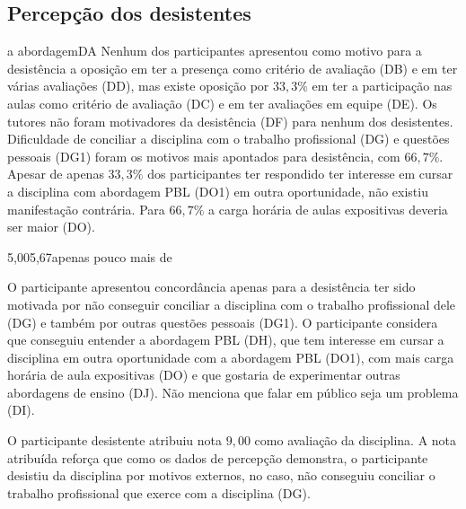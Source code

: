 \subsection{Percepção dos desistentes}
%
{a abordagem}{DA}{}{}
Nenhum dos participantes apresentou como motivo para a desistência a
oposição em ter a presença como critério de avaliação (DB) e
em ter várias avaliações (DD), mas existe oposição por $33,3\%$
em ter a participação nas aulas como critério de avaliação (DC) e em ter
avaliações em equipe (DE).
Os tutores não foram motivadores da desistência (DF) para nenhum
dos desistentes.
Dificuldade de conciliar a disciplina com
o trabalho profissional (DG) e questões pessoais (DG1)
foram os motivos mais apontados para desistência,
com $66,7\%$.
Apesar de apenas $33,3\%$ dos participantes ter respondido ter interesse
em cursar a disciplina com abordagem \ac{PBL} (DO1) em outra oportunidade,
não existiu manifestação contrária.
Para $66,7\%$ a carga horária de aulas expositivas deveria ser maior (DO).

{5,00}{5,67}{apenas pouco mais de}

O participante apresentou concordância apenas para a desistência ter sido motivada
por não conseguir conciliar a disciplina com o trabalho profissional
dele (DG) e também por outras questões pessoais (DG1).
O participante considera que conseguiu entender a abordagem \ac{PBL} (DH),
que tem interesse em cursar a disciplina em outra oportunidade com
a abordagem \ac{PBL} (DO1), com mais carga horária de aula expositivas (DO) e
que gostaria de experimentar outras abordagens de ensino (DJ).
Não menciona que falar em público seja um problema (DI).


O participante desistente atribuiu nota $9,00$ como avaliação da
disciplina.
A nota atribuída reforça que como os dados de percepção demonstra,
o participante desistiu da disciplina por motivos externos, no caso,
não conseguiu conciliar o trabalho profissional que exerce com
a disciplina (DG).
